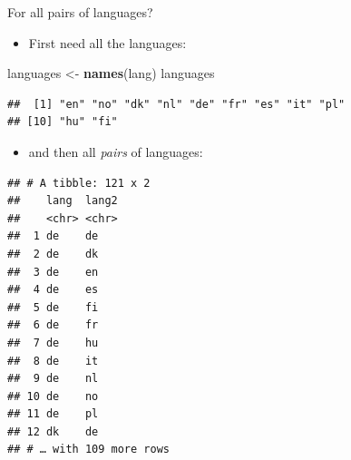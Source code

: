 \documentclass[ignorenonframetext,]{beamer}
\newenvironment{Shaded}{\begin{snugshade}}{\end{snugshade}}
\newcommand{\DataTypeTok}[1]{\textcolor[rgb]{0.13,0.29,0.53}{#1}}
\newcommand{\DecValTok}[1]{\textcolor[rgb]{0.00,0.00,0.81}{#1}}
\newcommand{\KeywordTok}[1]{\textcolor[rgb]{0.13,0.29,0.53}{\textbf{#1}}}
\newcommand{\NormalTok}[1]{#1}
\newcommand{\OperatorTok}[1]{\textcolor[rgb]{0.81,0.36,0.00}{\textbf{#1}}}
\newcommand{\StringTok}[1]{\textcolor[rgb]{0.31,0.60,0.02}{#1}}
\providecommand{\tightlist}{%
  \setlength{\itemsep}{0pt}\setlength{\parskip}{0pt}}
\begin{document}
\begin{frame}[fragile]{For all pairs of languages?}
\protect\hypertarget{for-all-pairs-of-languages}{}

\begin{itemize}
\tightlist
\item
  First need all the languages:
\end{itemize}

\begin{Shaded}
\begin{Highlighting}[]
\NormalTok{languages <-}\StringTok{ }\KeywordTok{names}\NormalTok{(lang)}
\NormalTok{languages}
\end{Highlighting}
\end{Shaded}

\begin{verbatim}
##  [1] "en" "no" "dk" "nl" "de" "fr" "es" "it" "pl"
## [10] "hu" "fi"
\end{verbatim}

\begin{itemize}
\tightlist
\item
  and then all \emph{pairs} of languages:
\end{itemize}

\begin{Shaded}
\end{Shaded}

\begin{verbatim}
## # A tibble: 121 x 2
##    lang  lang2
##    <chr> <chr>
##  1 de    de   
##  2 de    dk   
##  3 de    en   
##  4 de    es   
##  5 de    fi   
##  6 de    fr   
##  7 de    hu   
##  8 de    it   
##  9 de    nl   
## 10 de    no   
## 11 de    pl   
## 12 dk    de   
## # … with 109 more rows
\end{verbatim}

\end{frame}
\end{document}
